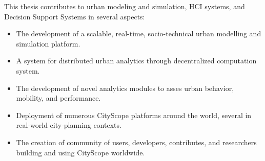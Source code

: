 {This thesis contributes to urban modeling and simulation, HCI systems, and Decision Support Systems in several aspects:
\begin{itemize}
    \setlength\itemsep{0em}
	\item The development of a scalable, real-time, socio-technical urban modelling and simulation platform.
	\item A system for distributed urban analytics through decentralized computation system. 
	\item The development of novel analytics modules to asses urban behavior, mobility, and performance. 
	\item Deployment of numerous CityScope platforms around the world, several in real-world city-planning contexts.
	\item The creation of community of users, developers, contributes, and researchers building and using CityScope worldwide.  
\end{itemize}
}
\newpage

\newpage

\newpage

\newpage





\newpage






